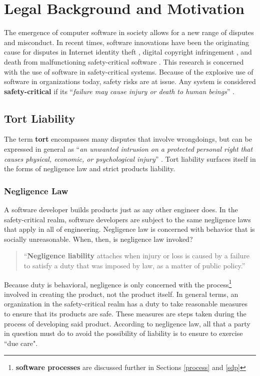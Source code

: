 \section{Legal Background and Motivation}\label{legal}
The emergence of computer software in society allows for a new range of disputes
and misconduct. In recent times, software innovations have been the originating
cause for disputes in Internet identity theft \cite{Valetk2004}, digital 
copyright infringement \cite{Manesh2006}, and death from malfunctioning 
safety-critical software \cite{Leveson1993}. This research is concerned with the
use of software in safety-critical systems. Because of the explosive use of
software in organizations today, safety risks are at issue. Any system is 
considered \textbf{safety-critical} if its ``\textit{failure may cause injury or
death to human beings}'' \cite{FOLDOC}.

\subsection{Tort Liability}
The term \textbf{tort} encompasses many disputes that involve wrongdoings, but 
can be expressed in general as ``\textit{an unwanted intrusion on a protected
personal right that causes physical, economic, or psychological injury}'' 
\cite{Burgunder2004}. Tort liability surfaces itself in the forms of negligence
law and strict products liability.

\subsubsection{Negligence Law}
A software developer builds products just as any other engineer does. In the
safety-critical realm, software developers are subject to the same negligence
laws that apply in all of engineering. Negligence law is concerned with behavior
that is socially unreasonable. When, then, is negligence law invoked?

\begin{quote}
``\textbf{Negligence liability} attaches when injury or loss is caused by a 
failure to satisfy a duty that was imposed by law, as a matter of public
policy.'' \cite{Kaner_neg_1995}
\end{quote}

Because duty is behavioral, negligence is only concerned with the
process\footnote{\textbf{software processes} are discussed further in
Sections \ref{process} and \ref{sdp}} involved in creating the product, not the
product itself. In general terms, an organization in the safety-critical realm
has a duty to take reasonable measures to ensure that its products are safe.
These measures are steps taken during the process of developing said product. 
According to negligence law, all that a party in question must do to avoid the 
possibility of liability is to ensure to exercise ``due care".

